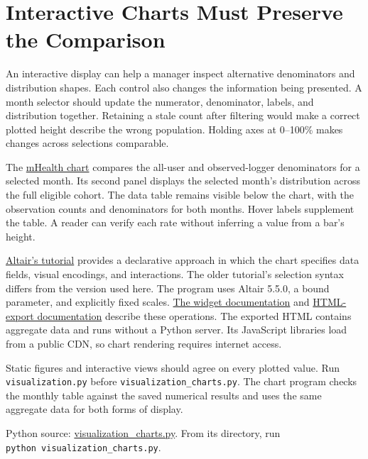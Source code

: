 \hypertarget{M02-interactive-charts-must-preserve-the-comparison}{%
\section{Interactive Charts Must Preserve the
Comparison}\label{M02-interactive-charts-must-preserve-the-comparison}}

\noindent An interactive display can help a manager inspect alternative
denominators and distribution shapes. Each control also changes the
information being presented. A month selector should update the
numerator, denominator, labels, and distribution together. Retaining a
stale count after filtering would make a correct plotted height describe
the wrong population. Holding axes at 0--100\% makes changes across
selections comparable.

The
\href{../03_Data_and_Code/mHealth/recurring_examples/results/visualization_interactive.html}{mHealth
chart} compares the all-user and observed-logger denominators for a
selected month. Its second panel displays the selected month's
distribution across the full eligible cohort. The data table remains
visible below the chart, with the observation counts and denominators
for both months. Hover labels supplement the table. A reader can verify
each rate without inferring a value from a bar's height.

\href{https://github.com/altair-viz/altair-tutorial}{Altair's tutorial}
provides a declarative approach in which the chart specifies data
fields, visual encodings, and interactions. The older tutorial's
selection syntax differs from the version used here. The program uses
Altair 5.5.0, a bound parameter, and explicitly fixed scales.
\href{https://altair-viz.github.io/user_guide/interactions/bindings_widgets.html}{The
widget documentation} and
\href{https://altair-viz.github.io/user_guide/saving_charts.html}{HTML-export
documentation} describe these operations. The exported HTML contains
aggregate data and runs without a Python server. Its JavaScript
libraries load from a public CDN, so chart rendering requires internet
access.

Static figures and interactive views should agree on every plotted
value. Run \texttt{visualization.py} before
\texttt{visualization\_charts.py}. The chart program checks the monthly
table against the saved numerical results and uses the same aggregate
data for both forms of display.

\FloatBarrier
{}
Python source:
\href{../03_Data_and_Code/mHealth/recurring_examples/visualization_charts.py}{visualization\_charts.py}.
From its directory, run \texttt{python\ visualization\_charts.py}.

